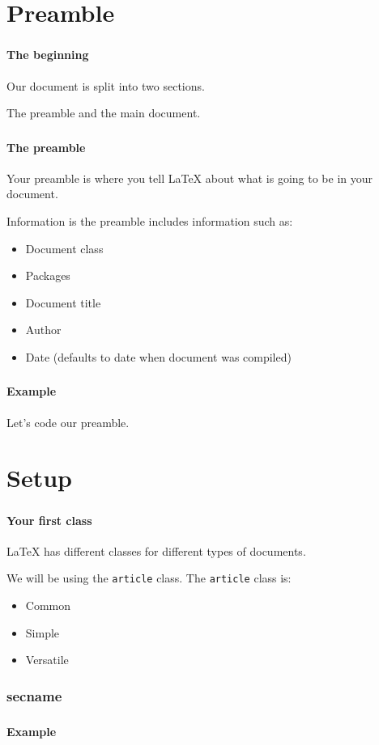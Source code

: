 \documentclass{beamer}
\begin{document}
	\section{Preamble}
	\begin{frame}
		\frametitle{\secname}
		\framesubtitle{The beginning}
		Our document is split into two sections.

		The \alert{preamble} and the \alert{main document}.
	\end{frame}
	\begin{frame}
		\frametitle{\secname}
		\framesubtitle{The preamble}
		Your preamble is where you tell \LaTeX{} about what is going to be in your document.

		Information is the preamble includes information such as:
		\begin{itemize}[<+->]
			\item Document class
			\item Packages
			\item Document title
			\item Author
			\item Date (defaults to date when document was compiled)
		\end{itemize}
	\end{frame}
	\begin{frame}
		\frametitle{\secname}
		\framesubtitle{Example}
		Let's code our preamble.
		
	\end{frame}
	\section{Setup}
	\begin{frame}
		\frametitle{\secname}
		\framesubtitle{Your first class}
		\LaTeX{} has different classes for different types of documents.

		We will be using the \lstinline{article} class.
		The \lstinline{article} class is:
		\pause
		\begin{itemize}[<+->]
			\item Common
			\item Simple
			\item Versatile
		\end{itemize}
	\end{frame}
	\begin{frame}[fragile]
	\frametitle{secname}
	\end{frame}
	\begin{frame}
		\frametitle{\secname}
		\framesubtitle{Example}
	\end{frame}
\end{document}

